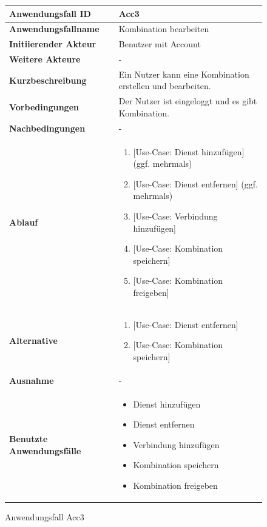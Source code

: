 \begin{figure}[h]
	\centering
	\begin{tabularx}{\textwidth}{ X | X }
		\textbf{Anwendungsfall ID} & Acc3 \\ \hline
		\textbf{Anwendungsfallname} & Kombination bearbeiten \\ \hline
		\textbf{Initiierender Akteur} & Benutzer mit Account\\ \hline
		\textbf{Weitere Akteure} & -  \\ \hline
		\textbf{Kurzbeschreibung} & Ein Nutzer kann eine Kombination erstellen und bearbeiten.  \\ \hline
		\textbf{Vorbedingungen} & Der Nutzer ist eingeloggt und es gibt Kombination.  \\ \hline
		\textbf{Nachbedingungen} & -  \\ \hline
		\textbf{Ablauf} &
		\begin{enumerate}
      \item {[Use-Case: Dienst hinzufügen]} (ggf. mehrmals)
			\item {[Use-Case: Dienst entfernen]} (ggf. mehrmals)
			\item {[Use-Case: Verbindung hinzufügen]}
			\item {[Use-Case: Kombination speichern]}
			\item {[Use-Case: Kombination freigeben]}
		\end{enumerate} \\ \hline
		\textbf{Alternative} &
		\begin{enumerate}
			\item {[Use-Case: Dienst entfernen]}
			\item {[Use-Case: Kombination speichern]}
		\end{enumerate}  \\ \hline
		\textbf{Ausnahme} &
		- \\ \hline
		\textbf{Benutzte Anwendungsfälle} &
    \begin{itemize}
			\item Dienst hinzufügen
			\item Dienst entfernen
      \item Verbindung hinzufügen
      \item Kombination speichern
      \item Kombination freigeben
		\end{itemize} \\ \hline
	\end{tabularx}
	\caption{Anwendungsfall Acc3}
	\label{fig:anwendungsfall-server-tabelle-xx-1}
\end{figure}
